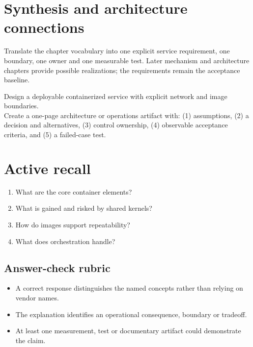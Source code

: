 \documentclass[10pt,letterpaper]{article}
\begin{document}
\section{Synthesis and architecture connections}
Translate the chapter vocabulary into one explicit service requirement, one boundary, one owner and one measurable test. Later mechanism and architecture chapters provide possible realizations; the requirements remain the acceptance baseline.
\begin{workbox}[title={Applied deliverable}]
Design a deployable containerized service with explicit network and image boundaries.\\[4pt]Create a one-page architecture or operations artifact with: (1) assumptions, (2) a decision and alternatives, (3) control ownership, (4) observable acceptance criteria, and (5) a failed-case test.
\end{workbox}
\section{Active recall}
\begin{enumerate}
\item What are the core container elements?
\item What is gained and risked by shared kernels?
\item How do images support repeatability?
\item What does orchestration handle?
\end{enumerate}
\subsection{Answer-check rubric}
\begin{itemize}
\item A correct response distinguishes the named concepts rather than relying on vendor names.
\item The explanation identifies an operational consequence, boundary or tradeoff.
\item At least one measurement, test or documentary artifact could demonstrate the claim.
\end{itemize}
\end{document}
